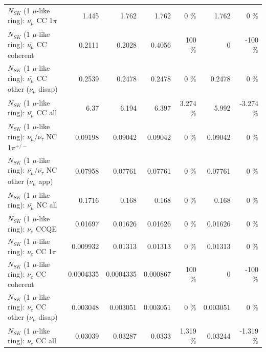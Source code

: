 \begin{table}
\begin{tabular}{| l | r | r | r  r | r  r |}
                         $N_{SK}$ (1 $\mu$-like ring): $\bar{\nu_\mu}$ CC 1$\pi$ &           1.445 &           1.762 &           1.762 &        0 \%  &           1.762 &        0 \%  \\ 
                       $N_{SK}$ (1 $\mu$-like ring): $\bar{\nu_\mu}$ CC coherent &          0.2111 &          0.2028 &          0.4056 &      100 \%  &               0 &     -100 \%  \\ 
        $N_{SK}$ (1 $\mu$-like ring): $\bar{\nu_\mu}$ CC other ($\nu_\mu$ disap) &          0.2539 &          0.2478 &          0.2478 &        0 \%  &          0.2478 &        0 \%  \\ 
                          $N_{SK}$ (1 $\mu$-like ring): $\bar{\nu_{\mu}}$ CC all &            6.37 &           6.194 &           6.397 &    3.274 \%  &           5.992 &   -3.274 \%  \\ 
\hline
  $N_{SK}$ (1 $\mu$-like ring): $\bar{\nu_\mu}$/$\bar{\nu_\tau}$ NC 1$\pi^{+/-}$ &         0.09198 &         0.09042 &         0.09042 &        0 \%  &         0.09042 &        0 \%  \\ 
$N_{SK}$ (1 $\mu$-like ring): $\bar{\nu_\mu}$/$\bar{\nu_\tau}$ NC other ($\nu_\mu$ app) &         0.07958 &         0.07761 &         0.07761 &        0 \%  &         0.07761 &        0 \%  \\ 
                          $N_{SK}$ (1 $\mu$-like ring): $\bar{\nu_{\mu}}$ NC all &          0.1716 &           0.168 &           0.168 &        0 \%  &           0.168 &        0 \%  \\ 
\hline
\hline
\hline
                                      $N_{SK}$ (1 $\mu$-like ring): $\nu_e$ CCQE &         0.01697 &         0.01626 &         0.01626 &        0 \%  &         0.01626 &        0 \%  \\ 
                                 $N_{SK}$ (1 $\mu$-like ring): $\nu_e$ CC 1$\pi$ &        0.009932 &         0.01313 &         0.01313 &        0 \%  &         0.01313 &        0 \%  \\ 
                               $N_{SK}$ (1 $\mu$-like ring): $\nu_e$ CC coherent &       0.0004335 &       0.0004335 &        0.000867 &      100 \%  &               0 &     -100 \%  \\ 
                $N_{SK}$ (1 $\mu$-like ring): $\nu_e$ CC other ($\nu_\mu$ disap) &        0.003048 &        0.003051 &        0.003051 &        0 \%  &        0.003051 &        0 \%  \\ 
                                  $N_{SK}$ (1 $\mu$-like ring): $\nu_{e}$ CC all &         0.03039 &         0.03287 &          0.0333 &    1.319 \%  &         0.03244 &   -1.319 \%  \\ 

\end{tabular}
\end{table}
